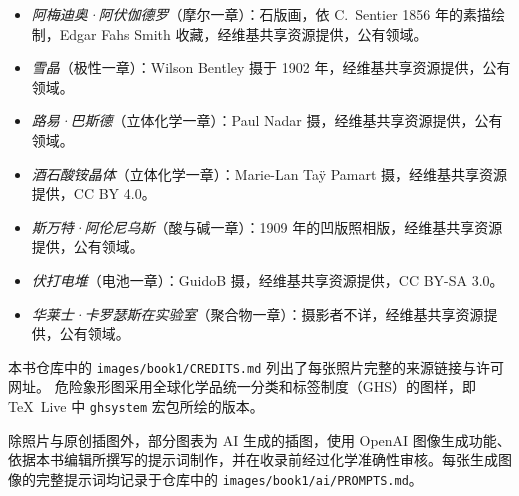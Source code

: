 \begin{itemize}
  \item \emph{阿梅迪奥·阿伏伽德罗}（摩尔一章）：石版画，依 C.~Sentier 1856 年的素描绘制，Edgar Fahs Smith 收藏，经维基共享资源提供，公有领域。
  \item \emph{雪晶}（极性一章）：Wilson Bentley 摄于 1902 年，经维基共享资源提供，公有领域。
  \item \emph{路易·巴斯德}（立体化学一章）：Paul Nadar 摄，经维基共享资源提供，公有领域。
  \item \emph{酒石酸铵晶体}（立体化学一章）：Marie-Lan Taÿ Pamart 摄，经维基共享资源提供，CC BY 4.0。
  \item \emph{斯万特·阿伦尼乌斯}（酸与碱一章）：1909 年的凹版照相版，经维基共享资源提供，公有领域。
  \item \emph{伏打电堆}（电池一章）：GuidoB 摄，经维基共享资源提供，CC BY-SA 3.0。
  \item \emph{华莱士·卡罗瑟斯在实验室}（聚合物一章）：摄影者不详，经维基共享资源提供，公有领域。
\end{itemize}

本书仓库中的 \texttt{images/book1/CREDITS.md} 列出了每张照片完整的来源链接与许可网址。
危险象形图采用全球化学品统一分类和标签制度（GHS）的图样，即 \TeX\ Live 中 \texttt{ghsystem} 宏包所绘的版本。

\bigskip
除照片与原创插图外，部分图表为 AI 生成的插图，使用 OpenAI 图像生成功能、依据本书编辑所撰写的提示词制作，并在收录前经过化学准确性审核。每张生成图像的完整提示词均记录于仓库中的 \texttt{images/book1/ai/PROMPTS.md}。
\clearpage
